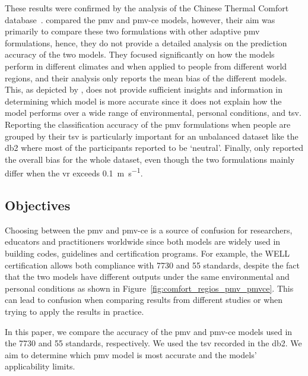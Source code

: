 These results were confirmed by the analysis of the Chinese Thermal Comfort database~\cite{du_evaluation_2022}.
 compared the \ac{pmv} and \ac{pmv-ce} models, however, their aim was primarily to compare these two formulations with other adaptive \ac{pmv} formulations, hence, they do not provide a detailed analysis on the prediction accuracy of the two models.
They focused significantly on how the models perform in different climates and when applied to people from different world regions, and their analysis only reports the mean bias of the different models.
This, as depicted by , does not provide sufficient insights and information in determining which model is more accurate since it does not explain how the model performs over a wide range of environmental, personal conditions, and \ac{tsv}.
Reporting the classification accuracy of the \ac{pmv} formulations when people are grouped by their \ac{tsv} is particularly important for an unbalanced dataset like the \ac{db2} where most of the participants reported to be `neutral'.
Finally,  only reported the overall bias for the whole dataset, even though the two formulations mainly differ when the \ac{vr} exceeds \qty{0.1}{\m\per\s}.

\subsection{Objectives}\label{subsec:aim-and-objectives}
Choosing between the \ac{pmv} and \ac{pmv-ce} is a source of confusion for researchers, educators and practitioners worldwide since both models are widely used in building codes, guidelines and certification programs.
For example, the WELL certification allows both compliance with \gls{7730} and \gls{55} standards, despite the fact that the two models have different outputs under the same environmental and personal conditions as shown in Figure~\ref{fig:comfort_regios_pmv_pmvce}.
This can lead to confusion when comparing results from different studies or when trying to apply the results in practice.

In this paper, we compare the accuracy of the \ac{pmv} and \ac{pmv-ce} models used in the \gls{7730} and \gls{55} standards, respectively.
We used the \ac{tsv} recorded in the \acf{db2}.
We aim to determine which \ac{pmv} model is most accurate and the models' applicability limits.